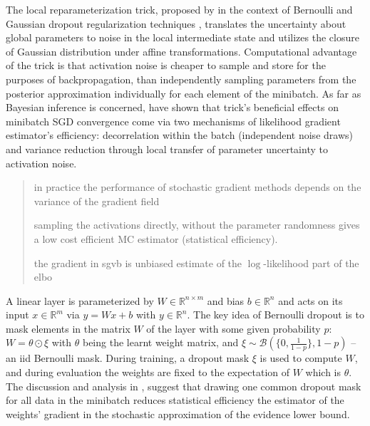 \documentclass[a4paper,10pt]{article}
\newcommand{\real}{\mathbb{R}}
\begin{document}

The local reparameterization trick, proposed by \cite{citation_wang_menning_2013} in the context
of Bernoulli and Gaussian dropout regularization techniques \cite{citation_needed}, translates
the uncertainty about global parameters to noise in the local intermediate state and utilizes
the closure of Gaussian distribution under affine transformations. Computational advantage of
the trick is that activation noise is cheaper to sample and store for the purposes of backpropagation,
than independently sampling parameters from the posterior approximation individually for each
element of the minibatch. As far as Bayesian inference is concerned, \cite{kingma_variational_2015}
have shown that trick's beneficial effects on minibatch SGD convergence come via two mechanisms
of likelihood gradient estimator's efficiency: decorrelation within the batch (independent noise
draws) and variance reduction through local transfer of parameter uncertainty to activation noise.

\begin{quote}

in practice the performance of stochastic gradient methods depends on the variance of the gradient
field

sampling the activations directly, without the parameter randomness gives a low cost efficient
MC estimator (statistical efficiency).

the gradient in sgvb is unbiased estimate of the $\log$-likelihood part of the elbo

\end{quote}

A linear layer is parameterized by $W \in\real^{n \times m}$ and bias $b\in \real^n$ and
acts on its input $x\in \real^m$ via $y = W x + b$ with $y\in \real^n$. The key idea of
Bernoulli dropout is to mask elements in the matrix $W$ of the layer
with some given probability $p$: $W = \theta \odot \xi$ with $\theta$ being the learnt
weight matrix, and $
  \xi \sim \mathcal{B}(\{0, \tfrac1{1-p}\}, 1-p)
$ -- an iid Bernoulli mask. During training, a dropout mask $\xi$ is used to compute $W$,
and during evaluation the weights are fixed to the expectation of $W$ which is $\theta$.
The discussion and analysis in \cite{kingma_variational_2015}, suggest that drawing one
common dropout mask for all data in the minibatch reduces statistical efficiency the estimator
of the weights' gradient in the stochastic approximation of the evidence lower bound. 
\end{document}
